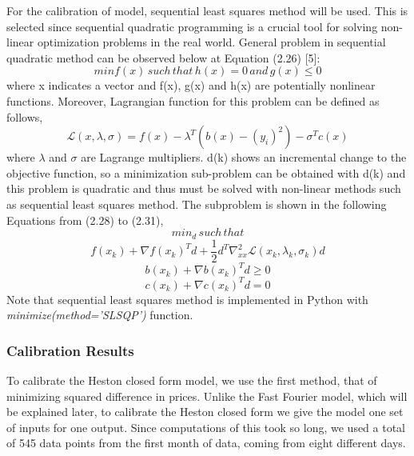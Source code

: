 \documentclass[fontsize=12pt]{article}
\numberwithin{equation}{section} %
\numberwithin{figure}{section} %
\numberwithin{table}{section} %
\begin{document}
For the calibration of model, sequential least squares method will be used. This is selected since sequential quadratic programming is a crucial tool for solving non-linear optimization problems in the real world. General problem in sequential quadratic method can be observed below at Equation (2.26) [5]:
\begin{equation}
min f(x) \, such \, that \,  h(x)=0 \,  and \,  g(x) \leq 0
\end{equation}
where x indicates a vector and f(x), g(x) and h(x) are potentially nonlinear functions. Moreover,  Lagrangian function for this problem can be defined as follows,
\begin{equation}
\mathcal{L}(x,\lambda,\sigma)=f(x)-\lambda^T(b(x)-(y_i)^2)-\sigma^Tc(x)
\end{equation}
where $\lambda$ and $\sigma$ are Lagrange multipliers. d(k) shows an incremental change to the objective function, so a  minimization sub-problem can be obtained with d(k) and this problem is quadratic and thus must be solved with non-linear methods such as sequential least squares method. The subproblem is shown in the following Equations from (2.28) to (2.31),	
\begin{equation}
min_d \,such \, that
\end{equation}
\begin{equation}
f(x_k)+\nabla f(x_k)^Td+\dfrac{1}{2}d^T\nabla^2_{xx}\mathcal{L}(x_k,\lambda_k,\sigma_k)d
\end{equation}
\begin{equation}
b(x_k)+\nabla b(x_k)^Td \geq 0
\end{equation}
\begin{equation}	
c(x_k)+\nabla c(x_k)^Td =0
\end{equation}
Note that sequential least squares method is implemented in Python with \textit{minimize(method='SLSQP') } function.

\subsubsection{Calibration Results}
To calibrate the Heston closed form model, we use the first method, that of minimizing squared difference in prices. Unlike the Fast Fourier model, which will be explained later, to calibrate the Heston closed form we give the model one set of inputs for one output. Since computations of this took so long, we used a total of 545 data points from the first month of data, coming from eight different days.
\end{document}
